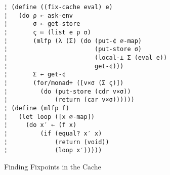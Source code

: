 \begin{figure}
\begin{lstlisting}
¦ (define ((fix-cache eval) e)  
¦   (do ρ ← ask-env
¦       σ ← get-store
¦       ς ≔ (list e ρ σ)
¦       (mlfp (λ (Σ) (do (put-¢ ∅-map)
¦                        (put-store σ)
¦                        (local-⊥ Σ (eval e))
¦                        get-¢)))
¦       Σ ← get-¢
¦       (for/monad+ ([v×σ (Σ ς)])
¦         (do (put-store (cdr v×σ))
¦             (return (car v×σ))))))
¦ (define (mlfp f)
¦   (let loop ([x ∅-map])
¦     (do x′ ← (f x)
¦         (if (equal? x′ x)
¦             (return (void))
¦             (loop x′)))))
\end{lstlisting}
\caption{Finding Fixpoints in the Cache}
\label{f:cache-fix}
\end{figure}

